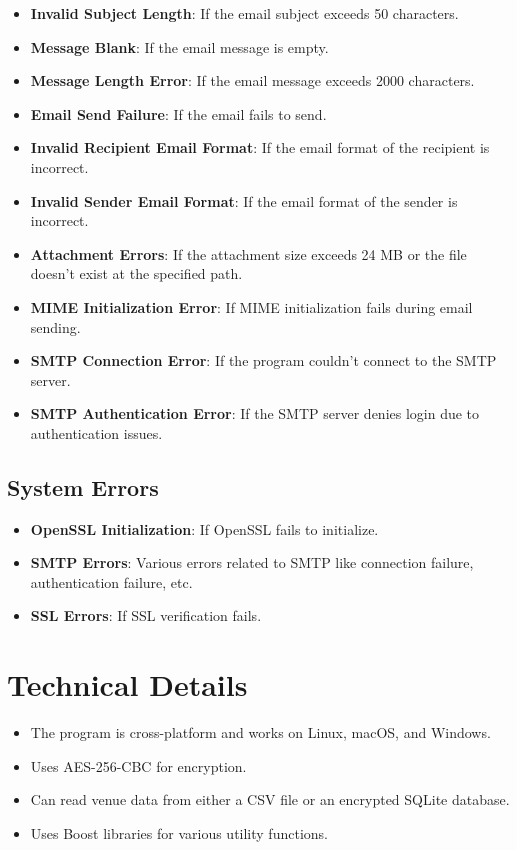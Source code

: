 \documentclass{article}
\begin{document}
	\begin{itemize}
		\item \textbf{Invalid Subject Length}: If the email subject exceeds 50 characters.
		\item \textbf{Message Blank}: If the email message is empty.
		\item \textbf{Message Length Error}: If the email message exceeds 2000 characters.
		\item \textbf{Email Send Failure}: If the email fails to send.
		\item \textbf{Invalid Recipient Email Format}: If the email format of the recipient is incorrect.
		\item \textbf{Invalid Sender Email Format}: If the email format of the sender is incorrect.
		\item \textbf{Attachment Errors}: If the attachment size exceeds 24 MB or the file doesn't exist at the specified path.
		\item \textbf{MIME Initialization Error}: If MIME initialization fails during email sending.
		\item \textbf{SMTP Connection Error}: If the program couldn't connect to the SMTP server.
		\item \textbf{SMTP Authentication Error}: If the SMTP server denies login due to authentication issues.
	\end{itemize}
	
	\subsection{System Errors}
	
	\begin{itemize}
		\item \textbf{OpenSSL Initialization}: If OpenSSL fails to initialize.
		\item \textbf{SMTP Errors}: Various errors related to SMTP like connection failure, authentication failure, etc.
		\item \textbf{SSL Errors}: If SSL verification fails.
	\end{itemize}
	
	\section{Technical Details}
	
	\begin{itemize}
		\item The program is cross-platform and works on Linux, macOS, and Windows.
		\item Uses AES-256-CBC for encryption.
		\item Can read venue data from either a CSV file or an encrypted SQLite database.
		\item Uses Boost libraries for various utility functions.
	\end{itemize}
	
\end{document}
